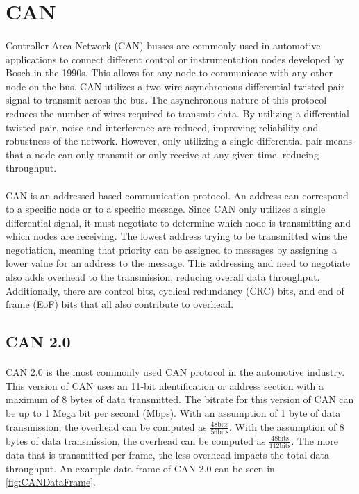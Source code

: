 \section{CAN}

\paragraph{}
Controller Area Network (CAN) \cite{wikipediaCAN} busses are commonly used in automotive applications to connect different control or instrumentation nodes developed by Bosch in the 1990s.
This allows for any node to communicate with any other node on the bus.
CAN utilizes a two-wire asynchronous differential twisted pair signal to transmit across the bus.
The asynchronous nature of this protocol reduces the number of wires required to transmit data.
By utilizing a differential twisted pair, noise and interference are reduced, improving reliability and robustness of the network.
However, only utilizing a single differential pair means that a node can only transmit or only receive at any given time, reducing throughput.

\paragraph{}
CAN is an addressed based communication protocol.
An address can correspond to a specific node or to a specific message.
Since CAN only utilizes a single differential signal, it must negotiate to determine which node is transmitting and which nodes are receiving.
The lowest address trying to be transmitted wins the negotiation, meaning that priority can be assigned to messages by assigning a lower value for an address to the message.
This addressing and need to negotiate also adds overhead to the transmission, reducing overall data throughput.
Additionally, there are control bits, cyclical redundancy (CRC) bits, and end of frame (EoF) bits that all also contribute to overhead.

\subsection{CAN 2.0}

\paragraph{}
CAN 2.0 \cite{BOSCH_CAN20} is the most commonly used CAN protocol in the automotive industry.
This version of CAN uses an 11-bit identification or address section with a maximum of 8 bytes of data transmitted.
The bitrate for this version of CAN can be up to 1 Mega bit per second (Mbps).
With an assumption of 1 byte of data transmission, the overhead can be computed as $\frac{48 \text{bits}}{56 \text{bits}}$.  With the assumption of 8 bytes of data transmission, the overhead can be computed as $\frac{48 \text{bits}}{112 \text{bits}}$.
The more data that is transmitted per frame, the less overhead impacts the total data throughput.
An example data frame of CAN 2.0 can be seen in \cref{fig:CANDataFrame}.

